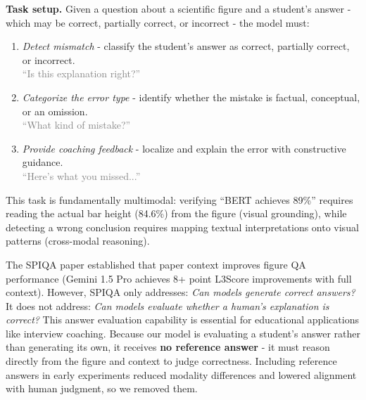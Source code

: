 \documentclass{article} %
\begin{document}
\textbf{Task setup.} Given a question about a scientific figure and a student's answer - which may be correct, partially correct, or incorrect - the model must:
\begin{enumerate}[itemsep=4pt]
    \item \textit{Detect mismatch} - classify the student's answer as correct, partially correct, or incorrect.\\
    \textcolor{gray}{\small``Is this explanation right?''}

    \item \textit{Categorize the error type} - identify whether the mistake is factual, conceptual, or an omission.\\
    \textcolor{gray}{\small``What kind of mistake?''}

    \item \textit{Provide coaching feedback} - localize and explain the error with constructive guidance.\\
    \textcolor{gray}{\small``Here's what you missed...''}
\end{enumerate}

This task is fundamentally multimodal: verifying ``BERT achieves 89\%'' requires reading the actual bar height (84.6\%) from the figure (visual grounding), while detecting a wrong conclusion requires mapping textual interpretations onto visual patterns (cross-modal reasoning).

The SPIQA paper established that paper context improves figure QA performance (Gemini 1.5 Pro achieves 8+ point L3Score improvements with full context). However, SPIQA only addresses: \textit{Can models generate correct answers?} It does not address: \textit{Can models evaluate whether a human's explanation is correct?} This answer evaluation capability is essential for educational applications like interview coaching. Because our model is evaluating a student's answer rather than generating its own, it receives \textbf{no reference answer} - it must reason directly from the figure and context to judge correctness. Including reference answers in early experiments reduced modality differences and lowered alignment with human judgment, so we removed them.
\end{document}
